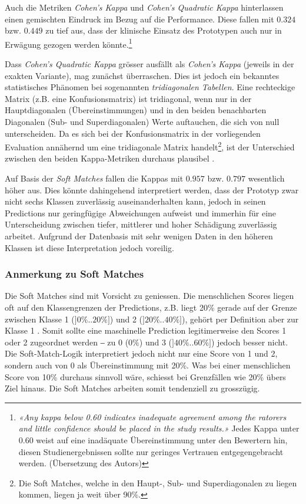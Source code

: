 Auch die Metriken \textit{Cohen's Kappa} und \textit{Cohen's Quadratic Kappa} hinterlassen einen gemischten Eindruck im Bezug auf die Performance. Diese fallen mit $0.324$ bzw. $0.449$ zu tief aus, dass der klinische Einsatz des Prototypen auch nur in Erwägung gezogen werden könnte.\footnote{\textit{«Any kappa below 0.60 indicates inadequate agreement among the ratorers and little confidence should be placed in the study results.»} \cite{interrater-reliability} Jedes Kappa unter 0.60 weist auf eine inadäquate Übereinstimmung unter den Bewertern hin, diesen Studienergebnissen sollte nur geringes Vertrauen entgegengebracht werden. (Übersetzung des Autors)}

Dass \textit{Cohen's Quadratic Kappa} grösser ausfällt als \textit{Cohen's Kappa} (jeweils in der exakten Variante), mag zunächst überraschen. Dies ist jedoch ein bekanntes statistisches Phänomen bei sogenannten \textit{tridiagonalen Tabellen}. Eine rechteckige Matrix (z.B. eine Konfusionsmatrix) ist tridiagonal, wenn nur in der Hauptdiagonalen (Übereinstimmungen) und in den beiden benachbarten Diagonalen (Sub- und Superdiagonalen) Werte auftauchen, die sich von null unterscheiden. Da es sich bei der Konfusionsmatrix in der vorliegenden Evaluation annähernd um eine tridiagonale Matrix handelt\footnote{Die Soft Matches, welche in den Haupt-, Sub- und Superdiagonalen zu liegen kommen, liegen ja weit über 90\%.}, ist der Unterschied zwischen den beiden Kappa-Metriken durchaus plausibel \cite{warrens-kappa}.

Auf Basis der \textit{Soft Matches} fallen die Kappas mit $0.957$ bzw. $0.797$ wesentlich höher aus. Dies könnte dahingehend interpretiert werden, dass der Prototyp zwar nicht sechs Klassen zuverlässig auseinanderhalten kann, jedoch in seinen Predictions nur geringfügige Abweichungen aufweist und immerhin für eine Unterscheidung zwischen tiefer, mittlerer und hoher Schädigung zuverlässig arbeitet. Aufgrund der Datenbasis mit sehr wenigen Daten in den höheren Klassen ist diese Interpretation jedoch voreilig.

\subsubsection{Anmerkung zu Soft Matches}
\label{sec:anmerkung-zu-soft-matches}

Die Soft Matches sind mit Vorsicht zu geniessen. Die menschlichen Scores liegen oft auf den Klassengrenzen der Predictions, z.B. liegt 20\% gerade auf der Grenze zwischen Klasse 1 ($]0\%..20\%]$) und 2 ($]20\%.. 40\%]$), gehört per Definition aber zur Klasse 1 \cite[S. 10]{rohrbach2017}. Somit sollte eine maschinelle Prediction legitimerweise den Scores 1 oder 2 zugeordnet werden ‒ zu 0 ($0\%$) und 3 ($]40\%..60\%]$) jedoch besser nicht. Die Soft-Match-Logik interpretiert jedoch nicht nur eine Score von 1 und 2, sondern auch von 0 als Übereinstimmung mit 20\%. Was bei einer menschlichen Score von 10\% durchaus sinnvoll wäre, schiesst bei Grenzfällen wie 20\% übers Ziel hinaus. Die Soft Matches arbeiten somit tendenziell zu grosszügig.

